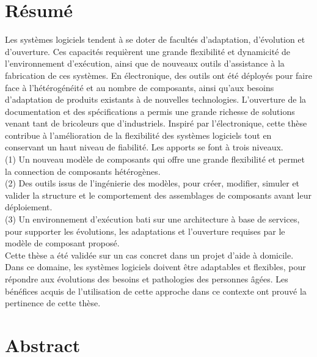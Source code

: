 \section*{R\'esum\'e}
Les systèmes logiciels tendent à se doter de facultés d’adaptation, d’évolution et d’ouverture. Ces capacités requièrent une grande flexibilité et dynamicité de l’environnement d’exécution, ainsi que de nouveaux outils d’assistance à la fabrication de ces systèmes. En électronique, des outils ont été déployés pour faire face à l’hétérogénéité et au nombre de composants, ainsi qu’aux besoins d’adaptation de produits existants à de nouvelles technologies. L’ouverture de la documentation et des spécifications a permis une grande richesse de solutions venant tant de bricoleurs que d’industriels.
Inspiré par l’électronique, cette thèse contribue à l’amélioration de la flexibilité des systèmes logiciels tout en conservant un haut niveau de fiabilité. Les apports se font à trois niveaux.\\
(1) Un nouveau modèle de composants qui offre une grande flexibilité et permet la connection de composants hétérogènes. \\
(2) Des outils issus de l’ingénierie des modèles, pour créer, modifier, simuler et valider la structure et le comportement des assemblages de composants avant leur déploiement. \\
(3) Un environnement d’exécution bati sur une architecture à base de services, pour supporter les évolutions, les adaptations et l’ouverture requises par le modèle de composant proposé.\\
Cette thèse a été validée sur un cas concret dans un projet d’aide à domicile. Dans ce domaine, les systèmes logiciels doivent être adaptables et flexibles, pour répondre aux évolutions des besoins et pathologies des personnes âgées. Les bénéfices acquis de l’utilisation de cette approche dans ce contexte ont prouvé la pertinence de cette thèse.



\section*{Abstract}

